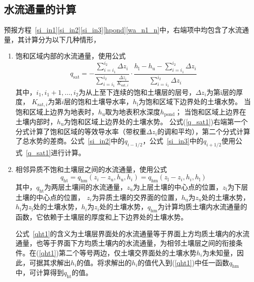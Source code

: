 \subsection{水流通量的计算}
预报方程~\eqref{si_in1}\eqref{si_in2}\eqref{si_in3}\eqref{hpond}\eqref{wa_n1_n}中，右端项中均包含了水流通量，其计算分为以下几种情形，
\begin{enumerate}
  \item 饱和区域内部的水流通量，使用公式
    \begin{equation}\label{q_sat1}
      q_{\mathrm{sat}}=-\frac{\sum_{i=i_{1}}^{i_{2}} \Delta z_{i}}{\sum_{i=i_{1}}^{i_{2}} \frac{\Delta z_{i}}{K_{\mathrm{sat},i}}}
      \cdot \frac{h_{\mathrm{l}}-h_{\mathrm{u}}-\sum_{i=i_{1}}^{i_{2}} \Delta z_{i}}{\sum_{i=i_{1}}^{i_{2}} \Delta z_{i}}
    \end{equation}
    其中，$i_1,i_1+1,…,i_2$为从上至下连续的饱和土壤层的层号，$\Delta z_i$为第i层的厚度，
    $K_{\mathrm{sat},i}$为第$i$层的饱和土壤导水率，$h_{\mathrm {l}} $为饱和区域下边界处的土壤水势。
    当饱和区域上边界为地表时，$h_{\mathrm {u}} $取为地表积水深度$h_{\mathrm{pond}}$；
    当饱和区域上边界在土壤内部时，$h_{\mathrm {u}} $为饱和区域上边界处的土壤水势。
    公式(\ref{q_sat1})右端第一个分式计算了饱和区域的等效导水率（带权重$\Delta z_i$的调和平均），第二个分式计算了总水势的差商。公式~\eqref{si_in2}中的$q_{i-1/2}$，公式~\eqref{si_in3}中的$q_{i+1/2}$使用公式~\eqref{q_sat1}进行计算。

  \item 相邻异质不饱和土壤层之间的水流通量，使用公式
    \begin{equation}\label{qht1}
      q_{\mathrm{h t}}=q_{\mathrm{h m}}\left(z_{i}-z_{\mathrm{u}}, h_{\mathrm{u}}, h_{i}\right)=q_{\mathrm{h m}}\left(z_{\mathrm{l}}-z_{i}, h_{i}, h_{\mathrm{l}}\right)
    \end{equation}
    其中，$q_{\mathrm{ht}}$为两层土壤间的水流通量，$z_{\mathrm {u}} $为上层土壤的中心点的位置，$z_{\mathrm {l}} $为下层土壤的中心点的位置，
    $z_i$为异质土壤的交界面的位置，$h_{\mathrm {u}} $为$z_{\mathrm {u}} $处的土壤水势，$h_{\mathrm {l}} $为$z_{\mathrm {l}} $处的土壤水势，$h_i$为$z_i$处的土壤水势，$q_{\mathrm{hm}}$为计算均质土壤内水流通量的函数，它依赖于土壤层的厚度和上下边界处的土壤水势。

    公式~\eqref{qht1}的含义为土壤层界面处的水流通量等于界面上方均质土壤内的水流通量，也等于界面下方均质土壤内的水流通量，为相邻土壤层之间的衔接条件。在(\ref{qht1})第二个等号两边，仅土壤交界面处的土壤水势$h_i$为未知量，因此，可据其求解出$h_i$的值。将求解出的$h_i$的值代入到(\ref{qht1})中任一函数$q_{\mathrm{hm}}$中，可计算得到$q_{\mathrm{ht}}$的值。


\end{enumerate}
